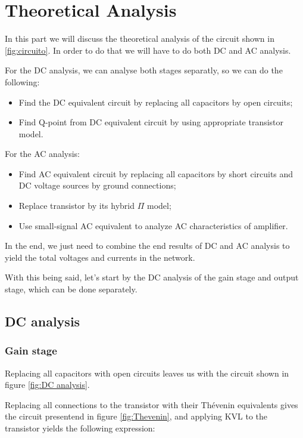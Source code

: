\clearpage

\section{Theoretical Analysis}
\label{sec:analysis}

In this part we will discuss the theoretical analysis of the circuit shown in \ref{fig:circuito}.
In order to do that we will have to do both DC and AC analysis.

For the DC analysis, we can analyse both stages separatly, so we can do the following:
\begin{itemize}
    \item Find the DC equivalent circuit by replacing all capacitors by open circuits;
    \item Find Q-point from DC equivalent circuit by using appropriate transistor model.
\end{itemize}

For the AC analysis:
\begin{itemize}
    \item Find AC equivalent circuit by replacing all capacitors by short circuits and DC voltage sources by ground connections;
    \item Replace transistor by its hybrid $\Pi$ model;
    \item Use small-signal AC equivalent to analyze AC characteristics of amplifier.
\end{itemize}

In the end, we just need to combine the end results of DC and AC analysis to yield the total voltages and currents in the network.

With this being said, let's start by the DC analysis of the gain stage and output stage, which can be done separately.

\subsection{DC analysis}
\subsubsection{Gain stage}
Replacing all capacitors with open circuits leaves us with the circuit shown in figure \ref{fig:DC analysis}.

Replacing all connections to the transistor with their Thévenin equivalents gives the circuit presentend in figure
\ref{fig:Thevenin}, and applying KVL to the transistor yields the following expression: 

